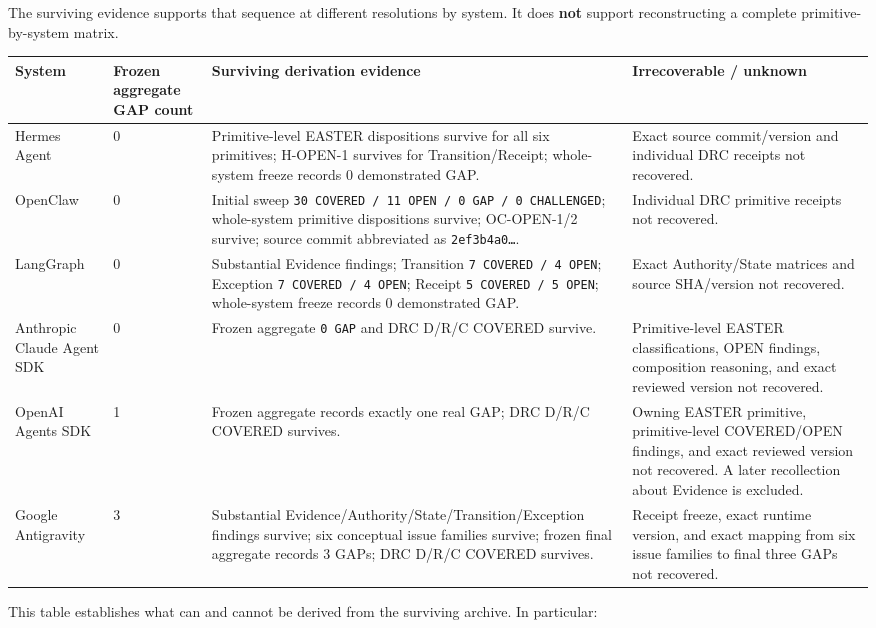 \documentclass[11pt]{article}
\begin{document}
The surviving evidence supports that sequence at different resolutions by system. It does \textbf{not} support reconstructing a complete primitive-by-system matrix.

\begin{table}[htbp]
\centering
\small
\begin{tabularx}{\textwidth}{X X X X}
\toprule
System & Frozen aggregate GAP count & Surviving derivation evidence & Irrecoverable / unknown \\
\midrule
Hermes Agent & 0 & Primitive-level EASTER dispositions survive for all six primitives; H-OPEN-1 survives for Transition/Receipt; whole-system freeze records 0 demonstrated GAP. & Exact source commit/version and individual DRC receipts not recovered. \\
OpenClaw & 0 & Initial sweep \texttt{30 COVERED / 11 OPEN / 0 GAP / 0 CHALLENGED}; whole-system primitive dispositions survive; OC-OPEN-1/2 survive; source commit abbreviated as \texttt{2ef3b4a0…}. & Individual DRC primitive receipts not recovered. \\
LangGraph & 0 & Substantial Evidence findings; Transition \texttt{7 COVERED / 4 OPEN}; Exception \texttt{7 COVERED / 4 OPEN}; Receipt \texttt{5 COVERED / 5 OPEN}; whole-system freeze records 0 demonstrated GAP. & Exact Authority/State matrices and source SHA/version not recovered. \\
Anthropic Claude Agent SDK & 0 & Frozen aggregate \texttt{0 GAP} and DRC D/R/C COVERED survive. & Primitive-level EASTER classifications, OPEN findings, composition reasoning, and exact reviewed version not recovered. \\
OpenAI Agents SDK & 1 & Frozen aggregate records exactly one real GAP; DRC D/R/C COVERED survives. & Owning EASTER primitive, primitive-level COVERED/OPEN findings, and exact reviewed version not recovered. A later recollection about Evidence is excluded. \\
Google Antigravity & 3 & Substantial Evidence/Authority/State/Transition/Exception findings survive; six conceptual issue families survive; frozen final aggregate records 3 GAPs; DRC D/R/C COVERED survives. & Receipt freeze, exact runtime version, and exact mapping from six issue families to final three GAPs not recovered. \\
\bottomrule
\end{tabularx}
\end{table}


This table establishes what can and cannot be derived from the surviving archive. In particular:
\end{document}
